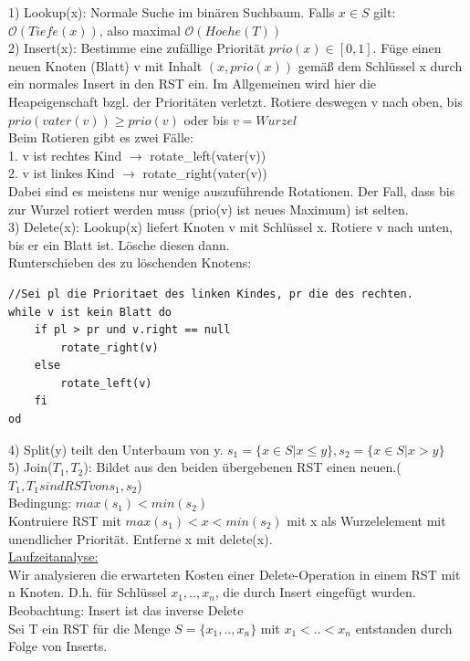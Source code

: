 \documentclass[a4paper]{article}
\newcommand{\oh}[1]{$\mathcal{O}(#1)$}
\begin{document}
1) Lookup(x): Normale Suche im binären Suchbaum. Falls $x\in S$ gilt: \oh{Tiefe(x)}, also maximal \oh{Hoehe(T)}\\
2) Insert(x): Bestimme eine zufällige Priorität $prio(x) \in [0,1]$. Füge einen neuen Knoten (Blatt) v mit Inhalt $(x,prio(x))$ gemäß dem Schlüssel x durch ein normales Insert in den RST ein. Im Allgemeinen wird hier die Heapeigenschaft bzgl. der Prioritäten verletzt. Rotiere deswegen v nach oben, bis $prio(vater(v)) \geq prio(v)$ oder bis $v=Wurzel$\\
Beim Rotieren gibt es zwei Fälle:\\
1. v ist rechtes Kind $\rightarrow$ rotate\_left(vater(v))\\
2. v ist linkes Kind $\rightarrow$ rotate\_right(vater(v))\\
Dabei sind es meistens nur wenige auszuführende Rotationen. Der Fall, dass bis zur Wurzel rotiert werden muss (prio(v) ist neues Maximum) ist selten.\\
3) Delete(x): Lookup(x) liefert Knoten v mit Schlüssel x. Rotiere v nach unten, bis er ein Blatt ist. Lösche diesen dann.\\
Runterschieben des zu löschenden Knotens:\\
\begin{lstlisting}
//Sei pl die Prioritaet des linken Kindes, pr die des rechten.
while v ist kein Blatt do
	if pl > pr und v.right == null
		rotate_right(v)
	else
		rotate_left(v)
	fi
od
\end{lstlisting}
4) Split(y) teilt den Unterbaum von y. $s_1 = \{x\in S | x\leq y\}, s_2=\{x\in S|x>y\}$\\
5) Join($T_1,T_2$): Bildet aus den beiden übergebenen RST einen neuen.($T_1,T_1 sind RST von s_1,s_2$)\\
\hspace*{1cm} Bedingung: $max(s_1)<min(s_2)$\\
\hspace*{1cm} Kontruiere RST mit $max(s_1)<x<min(s_2)$ mit x als Wurzelelement mit unendlicher Priorität. Entferne x mit delete(x).\\
\underline{Laufzeitanalyse:}\\
Wir analysieren die erwarteten Kosten einer Delete-Operation in einem RST mit n Knoten. D.h. für Schlüssel $x_1,..,x_n$, die durch Insert eingefügt wurden. Beobachtung: Insert ist das inverse Delete\\
Sei T ein RST für die Menge $S=\{x_1,..,x_n\}$ mit $x_1<..<x_n$ entstanden durch Folge von Inserts.\\
\end{document}
